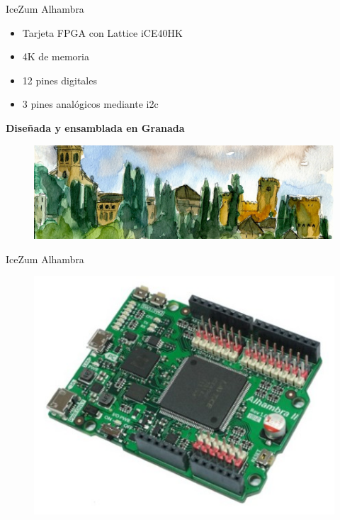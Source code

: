\documentclass{beamer}
\begin{document}
\begin{frame}{IceZum Alhambra}
	\begin{block}{}
		\begin{itemize}
			\item Tarjeta FPGA con Lattice iCE40HK \pause
			\item 4K de memoria \pause
			\item 12 pines digitales \pause
			\item 3 pines analógicos mediante i2c \pause
		\end{itemize}
	\end{block}
\begin{alertblock}{}
		\centering	\textbf{Diseñada y ensamblada en Granada}
		\begin{figure}[H]
			\center
			\includegraphics[trim = 0cm 0mm 0mm 0cm,clip, angle=0, scale = 0.2]{imagenes/Introduction/alhambrabits}
		\end{figure}
\end{alertblock}
\end{frame}

\begin{frame}{IceZum Alhambra}
	\begin{figure}[H]
		\center
		\includegraphics[trim = 0cm 0mm 0mm 0cm,clip, angle=0, scale = 0.5]{imagenes/EstadoArte/IceZumAlhambraII}
	\end{figure}
\end{frame}
\end{document}
